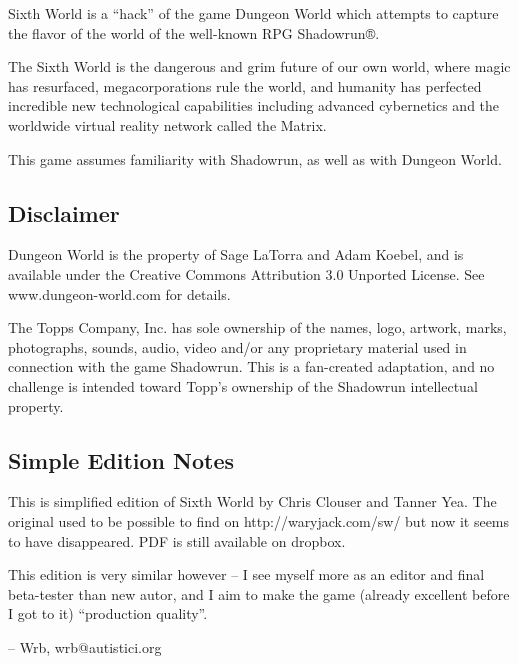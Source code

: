 Sixth World is a ``hack'' of the game Dungeon World which attempts to capture the flavor of the world of the well-known RPG Shadowrun®.

The Sixth World is the dangerous and grim future of our own world, where magic has resurfaced, megacorporations rule the world, and humanity has perfected incredible new technological capabilities including advanced cybernetics and the worldwide virtual reality network called the Matrix.

This game assumes familiarity with Shadowrun, as well as with Dungeon World.

\subsection{Disclaimer}

Dungeon World is the property of Sage LaTorra and Adam Koebel, and is available under the Creative Commons Attribution 3.0 Unported License. See www.dungeon-world.com for details.

The Topps Company, Inc. has sole ownership of the names, logo, artwork, marks, photographs, sounds, audio, video and/or any proprietary material used in connection with the game Shadowrun. This is a fan-created adaptation, and no challenge is intended toward Topp’s ownership of the Shadowrun intellectual property.

\subsection{Simple Edition Notes}

This is simplified edition of Sixth World by Chris Clouser and Tanner Yea. The original used to be possible to find on http://waryjack.com/sw/ but now it seems to have disappeared. PDF is still available on dropbox.

This edition is very similar however – I see myself more as an editor and final beta-tester than new autor, and I aim to make the game (already excellent before I got to it) “production quality”.

– Wrb, wrb@autistici.org